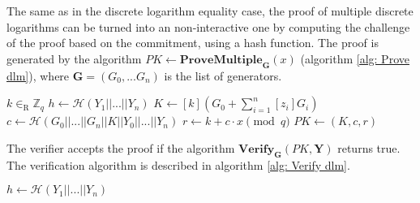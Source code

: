 The same as in the discrete logarithm equality case, the proof of multiple discrete logarithms can be turned into an non-interactive one by computing the challenge of the proof based on the commitment, using a hash function. The proof is generated by the algorithm \( PK \leftarrow \mathbf{ProveMultiple}_{\boldsymbol{G}} (x) \) (algorithm \ref{alg: Prove dlm}), where \( \boldsymbol{G} = (G_0, ... G_n) \) is the list of generators.

\begin{algorithm}[H]
\DontPrintSemicolon
    \caption{\( \mathbf{ProveMultiple}_{\boldsymbol{G}} (x) \)}
    \( k \in_\mathrm{R} \mathbb{Z}_q \)\;
    \( h \gets \mathcal{H} (Y_1 || ... || Y_n) \) 
    \( K \gets [k] (G_0 + \sum_{i=1}^n [z_i]G_i) \)\;
    \( c \gets \mathcal{H}(G_0 || ... || G_n || K || Y_0 || ... || Y_n) \) \;
    \( r \gets k + c \cdot x \pmod q \)\;
    \( PK \gets (K, c, r) \)\;
     
\end{algorithm}

The verifier accepts the proof if the algorithm $\mathbf{Verify}_{\boldsymbol{G}} (PK, \boldsymbol{Y})$ returns true. The verification algorithm is described in algorithm \ref{alg: Verify dlm}.

\begin{algorithm}[H]
\DontPrintSemicolon
    \caption{\( \mathbf{VerifyMultiple}_{\boldsymbol{G}} (PK, \boldsymbol{Y}) \)}
    \( h \gets \mathcal{H} (Y_1 || ... || Y_n) \)\;
     
\end{algorithm}

